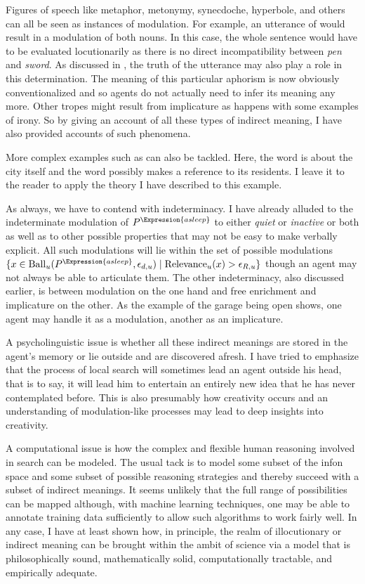 Figures of speech like metaphor, metonymy, synecdoche, hyperbole, and others can all be seen as instances of modulation. For example, an utterance of  would result in a modulation of both nouns. In this case, the whole sentence would have to be evaluated locutionarily as there is no direct incompatibility between \emph{pen} and \emph{sword}. As discussed in , the truth of the utterance may also play a role in this determination. The meaning of this particular aphorism is now obviously conventionalized and so agents do not actually need to infer its meaning any more. Other tropes might result from implicature as happens with some examples of irony. So by giving an account of all these types of indirect meaning, I have also provided accounts of such phenomena.

More complex examples such as  can also be tackled. Here, the word  is about the city itself and the word  possibly makes a reference to its residents. I leave it to the reader to apply the theory I have described to this example.

As always, we have to contend with indeterminacy. I have already alluded to the indeterminate modulation of $P^{\Expression{asleep}}$ to either \emph{quiet} or \emph{inactive} or both as well as to other possible properties that may not be easy to make verbally explicit. All such modulations will lie within the set of possible modulations $\{ x \in \hbox{Ball}_u(P^{\Expression{asleep}}, \epsilon_{d,u}) \mid  \hbox{Relevance}_u(x) > \epsilon_{R,u} \}$ though an agent may not always be able to articulate them. The other indeterminacy, also discussed earlier, is between modulation on the one hand and free enrichment and implicature on the other. As the example of the garage being open shows, one agent may handle it as a modulation, another as an implicature.

A psycholinguistic issue is whether all these indirect meanings are stored in the agent's memory or lie outside and are discovered afresh. I have tried to emphasize that the process of local search will sometimes lead an agent outside his head, that is to say, it will lead him to entertain an entirely new idea that he has never contemplated before. This is also presumably how creativity occurs and an understanding of modulation-like processes may lead to deep insights into creativity.

A computational issue is how the complex and flexible human reasoning involved in search can be modeled. The usual tack is to model some subset of the infon space and some subset of possible reasoning strategies and thereby succeed with a subset of indirect meanings. It seems unlikely that the full range of possibilities can be mapped although, with machine learning techniques, one may be able to annotate training data sufficiently to allow such algorithms to work fairly well. In any case, I have at least shown how, in principle, the realm of illocutionary or indirect meaning can be brought within the ambit of science via a model that is philosophically sound, mathematically solid, computationally tractable, and empirically adequate.

